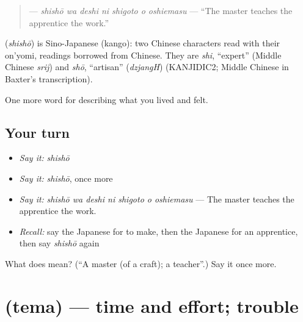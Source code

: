 \begin{quote}
\textbf{   } — \emph{shishō wa deshi ni shigoto o oshiemasu} — \textquotedblleft{}The master teaches the apprentice the work.\textquotedblright{}
\end{quote}

\begin{cousinweb}
\textbf{} (\emph{shishō}) is Sino-Japanese (kango): two Chinese characters read with their on'yomi, readings borrowed from Chinese. They are \emph{shi}, \textquotedblleft{}expert\textquotedblright{} (Middle Chinese \emph{srij}) and \emph{shō}, \textquotedblleft{}artisan\textquotedblright{} (\emph{dzjangH}) (KANJIDIC2; Middle Chinese in Baxter's transcription).
\end{cousinweb}

\begin{grammarlens}[title={What you've built}]
One more word for describing what you lived and felt.
\end{grammarlens}

\subsection*{Your turn}
\begin{itemize}
\raggedright
  \item \emph{Say it:} \emph{shishō}
  \item \emph{Say it:} \emph{shishō}, once more
  \item \emph{Say it:} \emph{shishō wa deshi ni shigoto o oshiemasu} — The master teaches the apprentice the work.
  \item \emph{Recall:} say the Japanese for to make, then the Japanese for an apprentice, then say \emph{shishō} again
\end{itemize}

\begin{tcolorbox}[breakable,colback=teal!4,colframe=teal!35!black,title={Before you move on}]
What does  mean? (\textquotedblleft{}A master (of a craft); a teacher\textquotedblright{}.) Say it once more.
\end{tcolorbox}
\section[\texorpdfstring{\ja{てま} (tema)}{てま (tema)}]{ (tema) — time and effort; trouble}

\label{lesson:JA-C480-tema}



